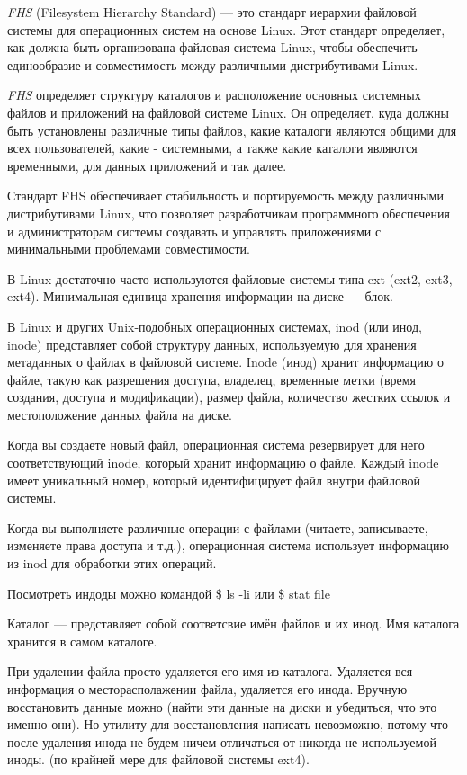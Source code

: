 \documentclass[oneside, final, 14pt]{extreport} %
\begin{document}
\textit{FHS} (Filesystem Hierarchy Standard) --- это стандарт иерархии файловой системы для операционных систем на основе Linux. Этот стандарт определяет, как должна быть организована файловая система Linux, чтобы обеспечить единообразие и совместимость между различными дистрибутивами Linux.

\textit{FHS} определяет структуру каталогов и расположение основных системных файлов и приложений на файловой системе Linux. Он определяет, куда должны быть установлены различные типы файлов, какие каталоги являются общими для всех пользователей, какие - системными, а также какие каталоги являются временными, для данных приложений и так далее.

Стандарт FHS обеспечивает стабильность и портируемость между различными дистрибутивами Linux, что позволяет разработчикам программного обеспечения и администраторам системы создавать и управлять приложениями с минимальными проблемами совместимости.

В Linux достаточно часто используются файловые системы типа ext (ext2, ext3, ext4).
Минимальная единица хранения информации на диске --- блок. 

В Linux и других Unix-подобных операционных системах, inod (или инод, inode) представляет собой структуру данных, используемую для хранения метаданных о файлах в файловой системе. Inode (инод) хранит информацию о файле, такую как разрешения доступа, владелец, временные метки (время создания, доступа и модификации), размер файла, количество жестких ссылок и местоположение данных файла на диске.

Когда вы создаете новый файл, операционная система резервирует для него соответствующий inode, который хранит информацию о файле. Каждый inode имеет уникальный номер, который идентифицирует файл внутри файловой системы.

Когда вы выполняете различные операции с файлами (читаете, записываете, изменяете права доступа и т.д.), операционная система использует информацию из inod для обработки этих операций.

Посмотреть индоды можно командой \$ ls -li или \$ stat file

Каталог --- представляет собой соответсвие имён файлов и их инод. Имя каталога хранится в самом каталоге.

\vspace{\baselineskip}
При удалении файла просто удаляется его имя из каталога. Удаляется вся информация
о месторасполажении файла, удаляется его инода. Вручную восстановить данные можно (найти 
эти данные на диски и убедиться, что это именно они). Но утилиту для восстановления написать невозможно, 
потому что после удаления инода не будем ничем отличаться от никогда не используемой иноды.
(по крайней мере для файловой системы ext4).
\end{document}
